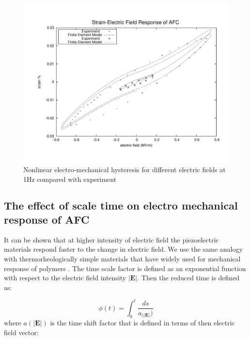 \begin{figure} 
\centering
\includegraphics[trim = 0mm 0mm 0mm 0mm,width=5.0in]
{./chap_4_structural_analyses/afc_unit_cell/non_linear_hysteris_afc/non_linear_electric_field_vs_polarization.pdf}
\caption{Nonlinear electro-mechanical hysteresis for different electric fields at 1Hz compared with experiment}
\label{fig:non_linear_electric_field_vs_polarization}
\end{figure}

\subsection{The effect of scale time on electro mechanical response of AFC}
It can be shown that at higher intensity of electric field the piezoelectric materials respond faster to the change in electric field.
We use the same analogy with thermorheologically simple materials that have widely used for mechanical response of polymers \cite{haj2004numerical, tscharnuter2012nonlinear}.
The time scale factor is defined as an exponential function with respect to the electric field intensity $|\textbf {E}|$.
Then the reduced time is defined as:



\begin{equation}
	\phi(t) = \int_0^t \frac{ ds } { a_{( |\textbf {E}| } ) } 
\label{equation:time_scaling}	
\end{equation}
where ${a(|\textbf {E}|)}$ is the time shift factor that is defined in terms of then electric field vector:
 
